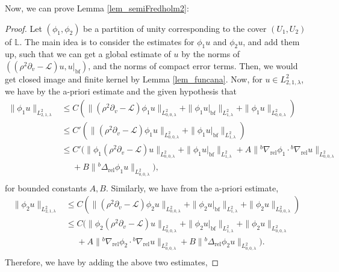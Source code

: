 \documentclass[10pt, a4paper]{article}
\theoremstyle{plain}%
\theoremstyle{definition}
\numberwithin{figure}{section}
\numberwithin{equation}{section}
\newcommand{\cL}{\mathcal{L}}
\newcommand{\rel}{\mathrm{rel}}
\newcommand{\botf}{\textrm{bf}}
\begin{document}
Now, we can prove Lemma \ref{lem_semiFredholm2}: 
\begin{proof}                               
	Let $(\phi_1,\phi_2)$ be a partition of unity corresponding to the cover $(U_1,U_2)$ of $\mathbb{L}$. The main idea is to consider the estimates for $\phi_1u$ and $\phi_2u$, and add them up, such that we can get a global estimate of $u$ by the norms of $((\rho^2\partial_v - \cL)u,u|_{\textrm{bf}})$, and the norms of compact error terms. Then, we would get closed image and finite kernel by Lemma \ref{lem_funcana}. Now, for $u\in L^2_{2,1,\lambda}$, we have by the a-priori estimate and the given hypothesis that
	\begin{equation}
		\begin{split}
			\|\phi_1u\|_{L^2_{2,1,\lambda}} 
			&\leq C(\|(\rho^2\partial_v - \mathcal{L})\phi_1u\|_{L^2_{0,0,\lambda}} + \|\phi_1u|_{\mathrm{bf}}\|_{L^2_{1,\lambda}} +\|\phi_1u\|_{L^2_{0,0,\lambda}}) \\
			& \leq C'(\|(\rho^2\partial_v - \mathcal{L})\phi_1u\|_{L^2_{0,0,\lambda}} + \|\phi_1u|_{\mathrm{bf}}\|_{L^2_{1,\lambda}})\\
			&\leq C'(\|\phi_1(\rho^2\partial_v - \mathcal{L})u\|_{L^2_{0,0,\lambda}} + \|\phi_1u|_{\botf}\|_{L^2_{1,\lambda}} + A\|{^b}\nabla_\rel \phi_1 \cdot {^b\nabla_\rel} u\|_{L^2_{{0,0,\lambda}}} \\
			&   \: \: \: \: \: \: + B\|{^b\Delta_\rel} \phi_1 u\|_{L^2_{0,0,\lambda}}),\\
		\end{split}
	\end{equation} 
	for bounded constants $A,B$. Similarly, we have from the a-priori estimate, \begin{equation}
		\begin{split}
			\|\phi_2u\|_{L^2_{2,1,\lambda}} 
			&\leq C(\|(\rho^2\partial_v - \mathcal{L})\phi_2u\|_{L^2_{0,0,\lambda}} + \|\phi_2u|_{\mathrm{bf}}\|_{L^2_{1,\lambda}} +\|\phi_2u\|_{L^2_{0,0,\lambda}}) \\
			&\leq C(\|\phi_2(\rho^2\partial_v - \mathcal{L})u\|_{L^2_{0,0,\lambda}} + \|\phi_2u|_{\botf}\|_{L^2_{1,\lambda}} + \|\phi_2u\|_{L^2_{0,0,\lambda}}\\  & \: \: \: \: \: \: + A\|{^b\nabla_\rel} \phi_2 \cdot {^b\nabla_\rel} u\|_{L^2_{{0,0,\lambda}}} + B\|{^b\Delta_\rel} \phi_2 u\|_{L^2_{0,0,\lambda}}).\\
		\end{split}
	\end{equation}
	Therefore, we have by adding the above two estimates,

\end{proof}
\end{document}

